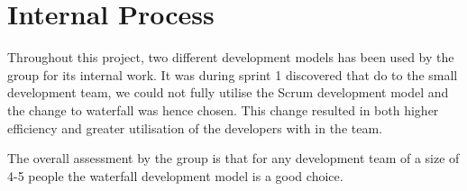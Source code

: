 \section{Internal Process}
Throughout this project, two different development models has been used by the group for its internal work.
It was during sprint 1 discovered that do to the small development team, we could not fully utilise the Scrum development model and the change to waterfall was hence chosen. 
This change resulted in both higher efficiency and greater utilisation of the developers with in the team.

The overall assessment by the group is that for any development team of a size of 4-5 people the waterfall development model is a good choice. 
